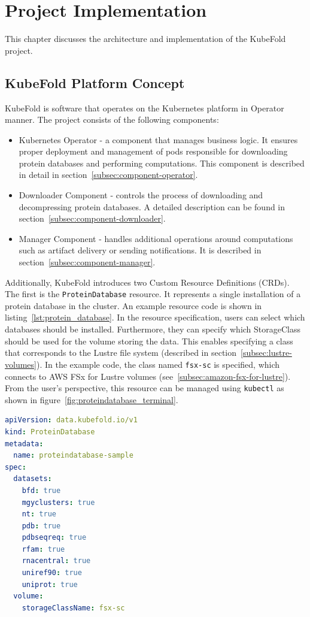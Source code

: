 \chapter{Project Implementation}
This chapter discusses the architecture and implementation of the KubeFold project.


\section{KubeFold Platform Concept}
KubeFold is software that operates on the Kubernetes platform in Operator manner.
The project consists of the following components:
\begin{itemize}
    \item Kubernetes Operator - a component that manages business logic.
    It ensures proper deployment and management of pods responsible for downloading protein databases and performing computations.
    This component is described in detail in section~\ref{subsec:component-operator}.
    \item Downloader Component - controls the process of downloading and decompressing protein databases.
    A detailed description can be found in section~\ref{subsec:component-downloader}.
    \item Manager Component - handles additional operations around computations such as artifact delivery or sending notifications.
    It is described in section~\ref{subsec:component-manager}.
\end{itemize}

Additionally, KubeFold introduces two Custom Resource Definitions (CRDs).
The first is the \texttt{ProteinDatabase} resource.
It represents a single installation of a protein database in the cluster.
An example resource code is shown in listing~\ref{lst:protein_database}.
In the resource specification, users can select which databases should be installed.
Furthermore, they can specify which StorageClass should be used for the volume storing the data.
This enables specifying a class that corresponds to the Lustre file system (described in section~\ref{subsec:lustre-volumes}).
In the example code, the class named \texttt{fsx-sc} is specified, which connects to AWS FSx for Lustre volumes (see~\ref{subsec:amazon-fsx-for-lustre}).
From the user's perspective, this resource can be managed using \texttt{kubectl} as shown in figure~\ref{fig:proteindatabase_terminal}.

\begin{lstlisting}[language=yaml,caption={Example \texttt{ProteinDatabase} resource definition},label={lst:protein_database}]
apiVersion: data.kubefold.io/v1
kind: ProteinDatabase
metadata:
  name: proteindatabase-sample
spec:
  datasets:
    bfd: true
    mgyclusters: true
    nt: true
    pdb: true
    pdbseqreq: true
    rfam: true
    rnacentral: true
    uniref90: true
    uniprot: true
  volume:
    storageClassName: fsx-sc
\end{lstlisting}


